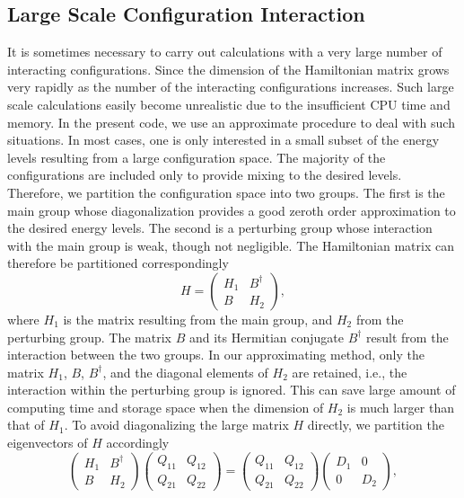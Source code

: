\subsection{Large Scale Configuration Interaction}
It is sometimes necessary to carry out calculations with a very large number of
interacting configurations. Since the dimension of the Hamiltonian matrix
grows very rapidly as the number of the interacting configurations
increases. Such large
scale calculations easily become unrealistic due to the insufficient CPU time
and memory. In the present code, we use an approximate procedure to deal with
such situations. In most cases, one is only interested in a small subset of the
energy levels resulting from a large configuration space. The
majority of the configurations are included only to provide mixing to the
desired levels. Therefore, we partition the configuration space into two
groups. The first is the main group whose diagonalization provides a good
zeroth order approximation to the desired energy levels. The second is a
perturbing group whose interaction with the main group is weak, though not
negligible. The Hamiltonian matrix can therefore be partitioned
correspondingly
\begin{equation}
H = \left(\begin{array}{cc}H_1 & B^{\dagger}\\B & H_2\end{array}\right),
\end{equation}
where $H_1$ is the matrix resulting from the main group, and $H_2$ from the
perturbing group. The matrix $B$ and its Hermitian conjugate $B^{\dagger}$
result from the interaction between the two groups. In our approximating
method, only 
the matrix $H_1$, $B$, $B^{\dagger}$, and the diagonal elements of $H_2$ are
retained, i.e., the interaction within the perturbing group is ignored. This
can save large amount of computing time and storage space when the dimension of
$H_2$ is much larger than that of $H_1$. To avoid diagonalizing the large
matrix $H$ directly, we partition the eigenvectors of $H$ accordingly
\begin{equation}
\left(\begin{array}{cc}H_1 & B^{\dagger} \\ B & H_2\end{array}\right) 
\left(\begin{array}{cc}Q_{11} & Q_{12} \\ Q_{21} & Q_{22} \end{array}\right) 
= \left(\begin{array}{cc}Q_{11} & Q_{12} \\ Q_{21} & Q_{22} \end{array}\right)
\left(\begin{array}{cc} D_1 & 0 \\ 0 & D_2 \end{array}\right),
\end{equation}

